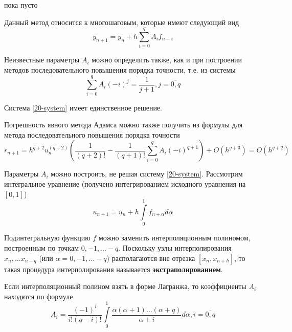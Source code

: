\begin{col-answer-preambule}
	\begin{plan}
    \item пока пусто
	\end{plan}
\end{col-answer-preambule}


Данный метод относится к многошаговым, которые имеют следующий вид
\begin{equation}
  \label{20-method}
  y_{n + 1} = y_n + h\sum\limits_{i = 0}^qA_if_{n - i}
\end{equation}

Неизвестные параметры $A_i$ можно определить также, как и при построении методов
последовательного повышения порядка точности, т.е. из системы
\begin{equation}
  \label{20-system}
  \sum\limits_{i = 0}^qA_i(-i)^j = \dfrac{1}{j + 1}, j = \overline{0, q}
\end{equation}

Система \eqref{20-system} имеет единственное решение.

Погрешность явного метода Адамса можно также получить из формулы для метода
последовательного повышения порядка точности
\begin{equation}
  r_{n + 1} = h^{q + 2}u_n^{(q + 2)}\left(\dfrac{1}{(q + 2)!} -
  \dfrac{1}{(q + 1)!}\sum\limits_{i = 0}^qA_i(-i)^{q + 1}\right) + O(h^{q + 3})
  = O(h^{q + 2})
\end{equation}

Параметры $A_i$ можно построить, не решая систему \eqref{20-system}. Рассмотрим
интегральное уравнение (получено интегрированием исходного уравнения на $[0, 1]$)
\begin{equation}
  \label{20-int-eq}
  u_{n + 1} = u_n + h\int\limits_0^1f_{n + \alpha}d\alpha
\end{equation}

Подинтегральную функцию $f$ можно заменить интерполяционным полиномом,
построенным по точкам $0, -1, \ldots -q$. Поскольку узлы интерполирования
$x_n, \ldots x_{n - q}$ (или $\alpha = 0, -1, \ldots -q$) располагаются вне
отрезка $[x_n, x_{n + h}]$, то такая процедура интерполирования называется
\textbf{экстраполированием}.

Если интерполяционный полином взять в форме Лагранжа, то коэффициенты $A_i$
находятся по формуле
\begin{equation}
  A_i = \dfrac{(-1)^i}{i! (q - i)!}\int\limits_0^1
  \dfrac{\alpha(\alpha + 1)\ldots(\alpha + q)}{\alpha + i}d\alpha, i = \overline{0, q}
\end{equation}


